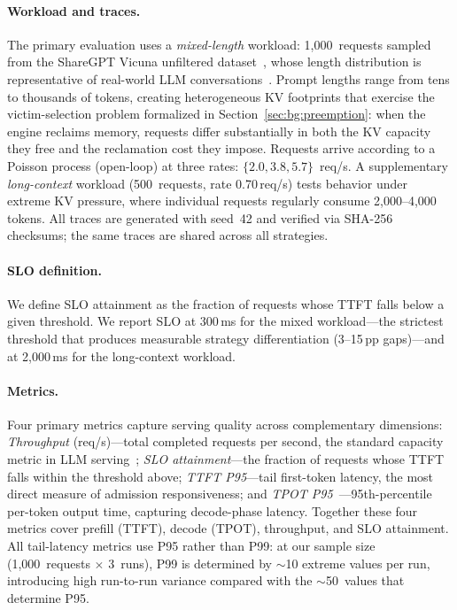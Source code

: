 \documentclass[sigconf,nonacm]{acmart}
\begin{document}
\paragraph{Workload and traces.}
The primary evaluation uses a \emph{mixed-length} workload: 1{,}000~requests
sampled from the ShareGPT Vicuna unfiltered
dataset~\cite{ShareGPT2023}, whose length distribution is
representative of real-world LLM conversations~\cite{Zheng2024lmsys}.
Prompt lengths range from tens to thousands of tokens, creating heterogeneous
KV footprints that exercise the victim-selection problem formalized in
Section~\ref{sec:bg:preemption}: when the engine reclaims memory, requests differ
substantially in both the KV capacity they free and the reclamation cost they
impose.  Requests arrive according to a Poisson process (open-loop) at three
rates: $\{2.0, 3.8, 5.7\}$~req/s.
A supplementary \emph{long-context} workload (500~requests,
rate 0.70\,req/s) tests behavior under extreme KV pressure, where
individual requests regularly consume 2{,}000--4{,}000 tokens.
All traces are generated with seed~42 and verified via SHA-256 checksums;
the same traces are shared across all strategies.

\paragraph{SLO definition.}
We define SLO attainment as the fraction of requests whose TTFT falls below
a given threshold.  We report SLO at 300\,ms for the mixed workload---the
strictest threshold that produces measurable strategy differentiation
(3--15\,pp gaps)---and at 2{,}000\,ms for the long-context workload.

\paragraph{Metrics.}
Four primary metrics capture serving quality across complementary dimensions:
\emph{Throughput} (req/s)---total completed requests per second, the standard
capacity metric in LLM serving~\cite{Kwon2023, Yu2022, Zheng2024sglang};
\emph{SLO attainment}---the fraction of requests whose
TTFT falls within the threshold above;
\emph{TTFT P95}---tail first-token latency, the most direct measure of
admission responsiveness;
and \emph{TPOT P95}~\cite{Agrawal2024sarathiserve}---95th-percentile per-token
output time, capturing decode-phase latency.
Together these four metrics cover prefill (TTFT), decode (TPOT), throughput, and
SLO attainment.
All tail-latency metrics use P95 rather than P99: at our sample size
(1{,}000~requests $\times$ 3~runs), P99 is determined by ${\sim}$10 extreme
values per run, introducing high run-to-run variance compared with the
${\sim}$50~values that determine P95.
\end{document}
